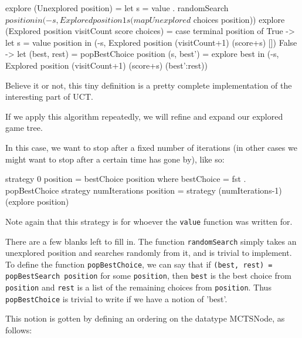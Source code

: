 \begin{code}

explore (Unexplored position) =
  let s = value . randomSearch $ position in
  (-s, Explored position 1 s (map Unexplored $ choices position))
explore (Explored position visitCount score choices) = 
  case terminal position of
    True ->
      let s = value position in
      (-s, Explored position (visitCount+1) (score+s) [])
    False ->
      let (best, rest) = popBestChoice position
          (s, best') = explore best in
          (-s, Explored position (visitCount+1) (score+s) (best':rest))

\end{code}


Believe it or not, this tiny definition is a pretty complete implementation of the interesting part of UCT.

If we apply this algorithm repeatedly, we will refine and expand our explored game tree.

In this case, we want to stop after a fixed number of iterations (in other cases we might want to stop after a certain time has gone by), like so:

\begin{code}
  strategy 0 position =
    bestChoice position
    where
    bestChoice = fst . popBestChoice
  strategy numIterations position  = 
    strategy (numIterations-1) (explore position)
\end{code}

Note again that this strategy is for whoever the \texttt{value} function was written for.

There are a few blanks left to fill in. The function \texttt{randomSearch} simply takes an unexplored position and searches randomly from it, and is trivial to implement.
To define the function \texttt{popBestChoice}, we can say that if \texttt{(best, rest) = popBestSearch position} for some \texttt{position}, then \texttt{best} is the best choice from \texttt{position} and \texttt{rest} is a list of the remaining choices from \texttt{position}.
Thus \texttt{popBestChoice} is trivial to write if we have a notion of 'best'.

This notion is gotten by defining an ordering on the datatype MCTSNode, as follows:



